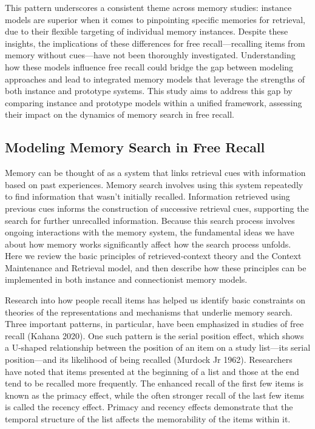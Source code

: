 \documentclass[
  letterpaper,
  11pt,
  english,
  singlespacing,
  headsepline]{MastersDoctoralThesis}
\begin{document}
This pattern underscores a consistent theme across memory studies:
instance models are superior when it comes to pinpointing specific
memories for retrieval, due to their flexible targeting of individual
memory instances. Despite these insights, the implications of these
differences for free recall---recalling items from memory without
cues---have not been thoroughly investigated. Understanding how these
models influence free recall could bridge the gap between modeling
approaches and lead to integrated memory models that leverage the
strengths of both instance and prototype systems. This study aims to
address this gap by comparing instance and prototype models within a
unified framework, assessing their impact on the dynamics of memory
search in free recall.

\subsection{Modeling Memory Search in Free
Recall}\label{modeling-memory-search-in-free-recall}

Memory can be thought of as a system that links retrieval cues with
information based on past experiences. Memory search involves using this
system repeatedly to find information that wasn't initially recalled.
Information retrieved using previous cues informs the construction of
successive retrieval cues, supporting the search for further unrecalled
information. Because this search process involves ongoing interactions
with the memory system, the fundamental ideas we have about how memory
works significantly affect how the search process unfolds. Here we
review the basic principles of retrieved-context theory and the Context
Maintenance and Retrieval model, and then describe how these principles
can be implemented in both instance and connectionist memory models.

Research into how people recall items has helped us identify basic
constraints on theories of the representations and mechanisms that
underlie memory search. Three important patterns, in particular, have
been emphasized in studies of free recall (Kahana 2020). One such
pattern is the serial position effect, which shows a U-shaped
relationship between the position of an item on a study list---its
serial position---and its likelihood of being recalled (Murdock Jr
1962). Researchers have noted that items presented at the beginning of a
list and those at the end tend to be recalled more frequently. The
enhanced recall of the first few items is known as the primacy effect,
while the often stronger recall of the last few items is called the
recency effect. Primacy and recency effects demonstrate that the
temporal structure of the list affects the memorability of the items
within it.
\end{document}
